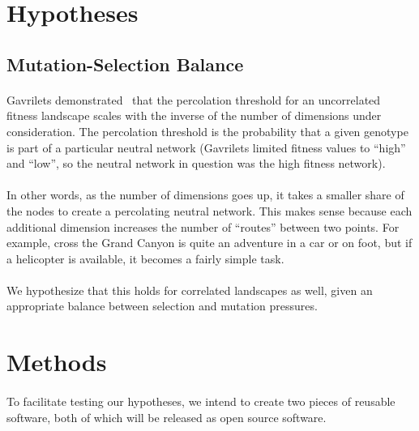 \documentclass[12pt,letterpaper,titlepage]{article}
\begin{document}
\section{Hypotheses}

\subsection{Mutation-Selection Balance}

\paragraph{}
Gavrilets demonstrated~\cite{Gavrilets1997} that the percolation threshold for
an uncorrelated fitness landscape scales with the inverse of the number of
dimensions under consideration. The percolation threshold is the probability
that a given genotype is part of a particular neutral network (Gavrilets
limited fitness values to ``high'' and ``low'', so the neutral network in
question was the high fitness network).

\paragraph{}
In other words, as the number of dimensions goes up, it takes a smaller share
of the nodes to create a percolating neutral network. This makes sense because
each additional dimension increases the number of ``routes'' between two
points. For example, cross the Grand Canyon is quite an adventure in a car or
on foot, but if a helicopter is available, it becomes a fairly simple task.

\paragraph{}
We hypothesize that this holds for correlated landscapes as well, given an
appropriate balance between selection and mutation pressures.

\section{Methods}

\paragraph{}
To facilitate testing our hypotheses, we intend to create two pieces of
reusable software, both of which will be released as open source software.
\end{document}
